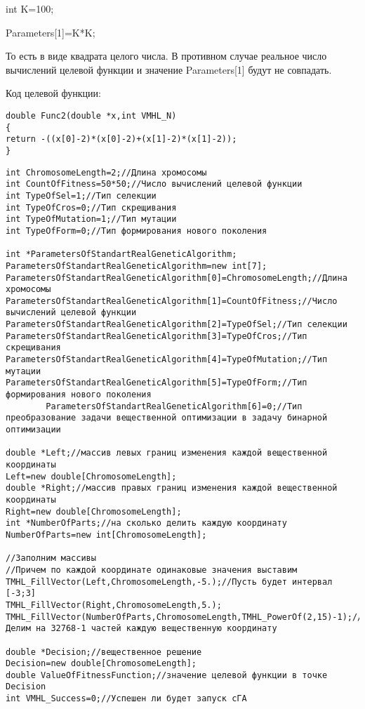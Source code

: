 \documentclass[a4paper,12pt]{article}
\begin{document}
int K=100;

Parameters[1]=K*K;

То есть в виде квадрата целого числа. В противном случае реальное число вычислений целевой функции и значение Parameters[1] будут не совпадать.

Код целевой функции:
\begin{lstlisting}[caption=Оптимизируемая функция]
double Func2(double *x,int VMHL_N)
{
return -((x[0]-2)*(x[0]-2)+(x[1]-2)*(x[1]-2));
}
\end{lstlisting}


\begin{lstlisting}[label=code_use_MHL_StandartRealGeneticAlgorithm,caption=Пример использования]
int ChromosomeLength=2;//Длина хромосомы
int CountOfFitness=50*50;//Число вычислений целевой функции
int TypeOfSel=1;//Тип селекции
int TypeOfCros=0;//Тип скрещивания
int TypeOfMutation=1;//Тип мутации
int TypeOfForm=0;//Тип формирования нового поколения

int *ParametersOfStandartRealGeneticAlgorithm;
ParametersOfStandartRealGeneticAlgorithm=new int[7];
ParametersOfStandartRealGeneticAlgorithm[0]=ChromosomeLength;//Длина хромосомы
ParametersOfStandartRealGeneticAlgorithm[1]=CountOfFitness;//Число вычислений целевой функции
ParametersOfStandartRealGeneticAlgorithm[2]=TypeOfSel;//Тип селекции
ParametersOfStandartRealGeneticAlgorithm[3]=TypeOfCros;//Тип скрещивания
ParametersOfStandartRealGeneticAlgorithm[4]=TypeOfMutation;//Тип мутации
ParametersOfStandartRealGeneticAlgorithm[5]=TypeOfForm;//Тип формирования нового поколения
		ParametersOfStandartRealGeneticAlgorithm[6]=0;//Тип преобразование задачи вещественной оптимизации в задачу бинарной оптимизации

double *Left;//массив левых границ изменения каждой вещественной координаты
Left=new double[ChromosomeLength];
double *Right;//массив правых границ изменения каждой вещественной координаты
Right=new double[ChromosomeLength];
int *NumberOfParts;//на сколько делить каждую координату
NumberOfParts=new int[ChromosomeLength];

//Заполним массивы
//Причем по каждой координате одинаковые значения выставим
TMHL_FillVector(Left,ChromosomeLength,-5.);//Пусть будет интервал [-3;3]
TMHL_FillVector(Right,ChromosomeLength,5.);
TMHL_FillVector(NumberOfParts,ChromosomeLength,TMHL_PowerOf(2,15)-1);//Делим на 32768-1 частей каждую вещественную координату

double *Decision;//вещественное решение
Decision=new double[ChromosomeLength];
double ValueOfFitnessFunction;//значение целевой функции в точке Decision
int VMHL_Success=0;//Успешен ли будет запуск cГА


\end{lstlisting}
\end{document}
